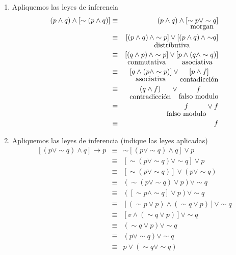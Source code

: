\solu
\begin{enumerate}
\item Apliquemos las leyes de inferencia
\begin{eqnarray*}
\left(p\wedge q\right)\wedge\left[\sim\left(p\wedge q\right)\right] & \equiv & \left(p\wedge q\right)\wedge\underset{\mbox{morgan}}{\left[\sim p\vee\sim q\right]}\\
 & \equiv & \underset{\mbox{distributiva}}{\left[\left(p\wedge q\right)\wedge\sim p\right]\vee\left[\left(p\wedge q\right)\text{\ensuremath{\wedge\sim}\ensuremath{q}}\right]}\\
 & \equiv & \underset{\mbox{conmutativa}}{\left[\left(q\wedge p\right)\wedge\sim p\right]}\vee\underset{\mbox{asociativa}}{\left[p\wedge\left(q\wedge\sim q\right)\right]}\\
 & \equiv & \underset{\mbox{asociativa}}{\left[q\wedge\left(p\wedge\sim p\right)\right]}\vee\underset{\mbox{contadicción}}{\left[p\wedge f\right]}\\
 & \equiv & \underset{\mbox{contradicción}}{\left(q\wedge f\right)}\vee\underset{\mbox{falso modulo}}{f}\\
 & \equiv & \underset{\mbox{falso modulo}}{f}\vee f\\
 & \equiv & f
\end{eqnarray*}
\item Apliquemos las leyes de inferencia (indique las leyes aplicadas) 
\begin{eqnarray*}
\left[\left(p\vee\sim q\right)\wedge q\right]\rightarrow p & \equiv & \sim\left[\left(p\vee\sim q\right)\wedge q\right]\vee p\\
 & \equiv & \left[\sim\left(p\vee\sim q\right)\vee\sim q\right]\vee p\\
 & \equiv & \left[\sim\left(p\vee\sim q\right)\right]\vee\left(p\vee\sim q\right)\\
 & \equiv & \left(\sim\left(p\vee\sim q\right)\vee p\right)\vee\sim q\\
 & \equiv & \left(\left[\sim p\wedge\sim q\right]\vee p\right)\vee\sim q\\
 & \equiv & \left[\left(\sim p\vee p\right)\wedge\left(\sim q\vee p\right)\right]\vee\sim q\\
 & \equiv & \left[v\wedge\left(\sim q\vee p\right)\right]\vee\sim q\\
 & \equiv & \left(\sim q\vee p\right)\vee\sim q\\
 & \equiv & \left(p\vee\sim q\right)\vee\sim q\\
 & \equiv & p\vee\left(\sim q\vee\sim q\right)\\

\end{eqnarray*}
\end{enumerate}
